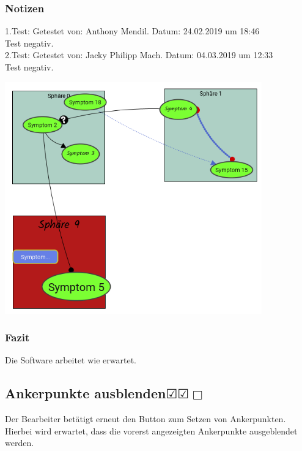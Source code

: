\documentclass[enabledeprecatedfontcommands]{scrartcl}
\newcommand{\subsectiont}[2]{\subsection[#1]{#1{\normalsize\normalfont #2}}}
\newcommand{\leer}{$\Box$}
\newcommand{\ok}{$\CheckedBox$}
\begin{document}
\subsubsection{Notizen}
1.Test: Getestet von: Anthony Mendil. Datum: 24.02.2019 um 18:46 \\
Test negativ.\\
2.Test: Getestet von: Jacky Philipp Mach. Datum: 04.03.2019 um 12:33 \\
Test negativ.
\begin{center}
\includegraphics[height=10cm]{3_37.PNG}
\end{center}
\subsubsection{Fazit}
Die Software arbeitet wie erwartet.

\subsectiont{Ankerpunkte ausblenden}{\dotfill\ok\ok\leer}
Der Bearbeiter betätigt erneut den Button zum Setzen von Ankerpunkten. Hierbei wird erwartet, dass die vorerst angezeigten Ankerpunkte ausgeblendet werden. 
\end{document}
